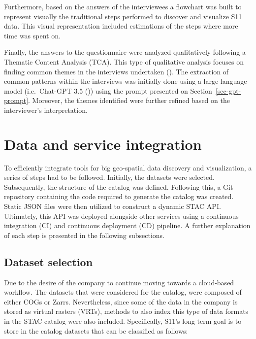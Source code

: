 \documentclass[
  oneside,
  open=any]{scrbook}
\begin{document}
Furthermore, based on the answers of the interviewees a flowchart was
built to represent visually the traditional steps performed to discover
and visualize S11 data. This visual representation included estimations
of the steps where more time was spent on.

Finally, the answers to the questionnaire were analyzed qualitatively
following a Thematic Content Analysis (TCA). This type of qualitative
analysis focuses on finding common themes in the interviews undertaken
(). The extraction
of common patterns within the interviews was initially done using a
large language model (i.e.~Chat-GPT 3.5
()) using the prompt
presented on Section~\ref{sec-gpt-prompt}. Moreover, the themes
identified were further refined based on the interviewer's
interpretation.

\section{Data and service
integration}\label{data-and-service-integration}

To efficiently integrate tools for big geo-spatial data discovery and
visualization, a series of steps had to be followed. Initially, the
datasets were selected. Subsequently, the structure of the catalog was
defined. Following this, a Git repository containing the code required
to generate the catalog was created. Static JSON files were then
utilized to construct a dynamic STAC API. Ultimately, this API was
deployed alongside other services using a continuous integration (CI)
and continuous deployment (CD) pipeline. A further explanation of each
step is presented in the following subsections.

\subsection{Dataset selection}\label{dataset-selection}

Due to the desire of the company to continue moving towards a
cloud-based workflow. The datasets that were considered for the catalog,
were composed of either COGs or Zarrs. Nevertheless, since some of the
data in the company is stored as virtual rasters (VRTs), methods to also
index this type of data formats in the STAC catalog were also included.
Specifically, S11's long term goal is to store in the catalog datasets
that can be classified as follows:
\end{document}
